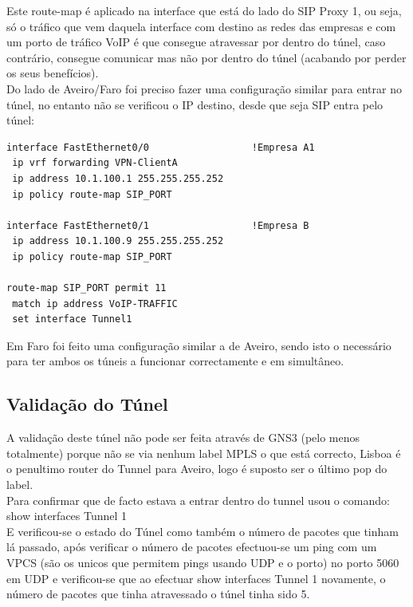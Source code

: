 \documentclass[11pt,a4paper]{report}
\begin{document}
Este route-map é aplicado na interface que está do lado do SIP Proxy 1, ou seja, só o tráfico que vem daquela interface com destino as redes das empresas e com um porto de tráfico VoIP é que consegue atravessar por dentro do túnel, caso contrário, consegue comunicar mas não por dentro do túnel (acabando por perder os seus benefícios).\\

Do lado de Aveiro/Faro foi preciso fazer uma configuração similar para entrar no túnel, no entanto não se verificou o IP destino, desde que seja SIP entra pelo túnel:

\begin{lstlisting}[caption=MPLS Tunnel - Aveiro rota de entrada no túnel]
interface FastEthernet0/0                  !Empresa A1
 ip vrf forwarding VPN-ClientA
 ip address 10.1.100.1 255.255.255.252
 ip policy route-map SIP_PORT

interface FastEthernet0/1                  !Empresa B
 ip address 10.1.100.9 255.255.255.252
 ip policy route-map SIP_PORT

route-map SIP_PORT permit 11
 match ip address VoIP-TRAFFIC
 set interface Tunnel1
\end{lstlisting}

Em Faro foi feito uma configuração similar a de Aveiro, sendo isto o necessário para ter ambos os túneis a funcionar correctamente e em simultâneo.

\subsection{Validação do Túnel}

A validação deste túnel não pode ser feita através de GNS3 (pelo menos totalmente) porque não se via nenhum label MPLS o que está correcto, Lisboa é o penultimo router do Tunnel para Aveiro, logo é suposto ser o último pop do label.\\

Para confirmar que de facto estava a entrar dentro do tunnel usou o comando: show interfaces Tunnel 1\\

E verificou-se o estado do Túnel como também o número de pacotes que tinham lá passado, após verificar o número de pacotes efectuou-se um ping com um VPCS (são os unicos que permitem pings usando UDP e o porto) no porto 5060 em UDP e verificou-se que ao efectuar show interfaces Tunnel 1 novamente, o número de pacotes que tinha atravessado o túnel tinha sido 5.\\
\end{document}
